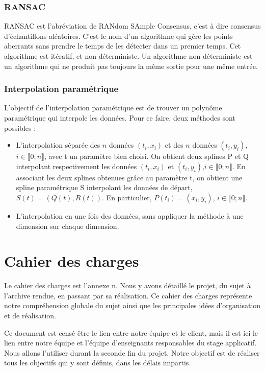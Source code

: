 \documentclass[a4paper,10pt]{article} %
\begin{document}
\subsubsection*{RANSAC}

RANSAC est l'abréviation de RANdom SAmple Consensus, c'est à dire consensus d'échantillons aléatoires. C'est le nom d'un algorithme qui gère les points aberrants sans prendre le temps de les détecter dans un premier temps. Cet algorithme est itératif, et non-déterministe. Un algorithme non déterministe est un algorithme qui ne produit pas toujours la même sortie pour une même entrée.

\subsubsection*{Interpolation paramétrique}

L'objectif de l'interpolation paramétrique est de trouver un polynôme paramétrique qui interpole les données. Pour ce faire, deux méthodes sont possibles :
\begin{itemize}
\item L'interpolation séparée des $n$ données $(t_i,x_i)$ et des $n$ données $(t_i,y_i)$, $i\in\llbracket 0; n \rrbracket$, avec t un paramètre bien choisi. On obtient deux splines P et Q interpolant respectivement les données $(t_i,x_i)$ et $(t_i,y_i)$,$i\in\llbracket 0; n \rrbracket$. En associant les deux splines obtenues grâce au paramètre t, on obtient une spline paramétrique S interpolant les données de départ, $S(t) = (Q(t),R(t))$. En particulier, $P(t_i) = (x_i,y_i)$, $i\in\llbracket 0; n \rrbracket$.
\item L'interpolation en une fois des données, sans appliquer la méthode à une dimension sur chaque dimension.
\end{itemize}


\section{Cahier des charges}

Le cahier des charges est l'annexe n. Nous y avons détaillé le projet, du sujet à l'archive rendue, en passant par sa réalisation. Ce cahier des charges représente notre compréhension globale du sujet ainsi que les principales idées d'organisation et de réalisation.

Ce document est censé être le lien entre notre équipe et le client, mais il est ici le lien entre notre équipe et l'équipe d'enseignants responsables du stage applicatif. Nous allons l'utiliser durant la seconde fin du projet. Notre objectif est de réaliser tous les objectifs qui y sont définis, dans les délais impartis.
\end{document}
